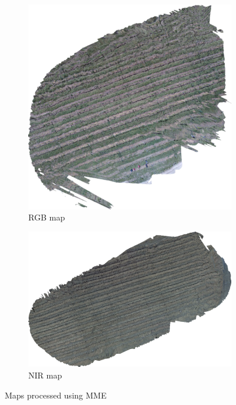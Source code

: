 \begin{figure}[H]
\begin{subfigure}{0.5\textwidth}
\centering
\includegraphics[scale=0.35]{images/map_rgb.png}
\caption{RGB map}
\end{subfigure}
\begin{subfigure}{0.5\textwidth}
\centering
\includegraphics[scale=0.4]{images/map_ir.png}
\caption{NIR map}
\end{subfigure}
\caption{Maps processed using MME}
\label{fig:maps}
\end{figure}

